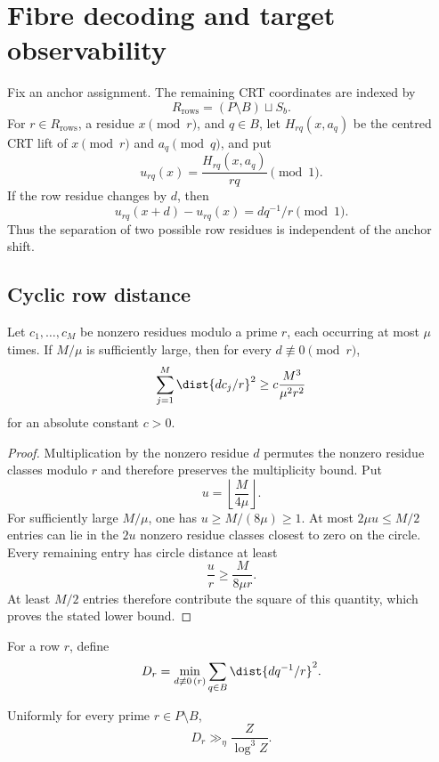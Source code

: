 \section{Fibre decoding and target observability}
\label{sec:fibre-decoding}

Fix an anchor assignment.  The remaining CRT coordinates are indexed by
\[
 R_{\mathrm{rows}}=(P\setminus B)\sqcup S_b.
\]
For $r\in R_{\mathrm{rows}}$, a residue $x\pmod r$, and $q\in B$, let $H_{rq}(x,a_q)$ be the centred CRT lift of $x\pmod r$ and $a_q\pmod q$, and put
\[
 u_{rq}(x)=\frac{H_{rq}(x,a_q)}{rq}\pmod1.
\]
If the row residue changes by $d$, then
\begin{equation}
\label{eq:row-shift}
 u_{rq}(x+d)-u_{rq}(x)=dq^{-1}/r\pmod1.
\end{equation}
Thus the separation of two possible row residues is independent of the anchor shift.

\subsection{Cyclic row distance}

\begin{lemma}
\label{lem:cyclic-energy}
Let $c_1,\ldots,c_M$ be nonzero residues modulo a prime $r$, each occurring at most $\mu$ times.  If $M/\mu$ is sufficiently large, then for every $d\not\equiv0\pmod r$,
\[
 \sum_{j=1}^M\dist{dc_j/r}^2
 \geq c\frac{M^3}{\mu^2r^2}
\]
for an absolute constant $c>0$.
\end{lemma}

\begin{proof}
Multiplication by the nonzero residue $d$ permutes the nonzero residue classes modulo $r$ and therefore preserves the multiplicity bound.  Put
\[
 u=\left\lfloor\frac{M}{4\mu}\right\rfloor.
\]
For sufficiently large $M/\mu$, one has $u\geq M/(8\mu)\geq1$.  At most $2\mu u\leq M/2$ entries can lie in the $2u$ nonzero residue classes closest to zero on the circle.  Every remaining entry has circle distance at least
\[
 \frac{u}{r}\geq\frac{M}{8\mu r}.
\]
At least $M/2$ entries therefore contribute the square of this quantity, which proves the stated lower bound.
\end{proof}

For a row $r$, define
\[
 D_r=\min_{d\not\equiv0\,(r)}\sum_{q\in B}\dist{dq^{-1}/r}^2.
\]

\begin{proposition}
\label{prop:lower-row-distance}
Uniformly for every prime $r\in P\setminus B$,
\[
 D_r\gg_\eta\frac{Z}{\log^3Z}.
\]
\end{proposition}


